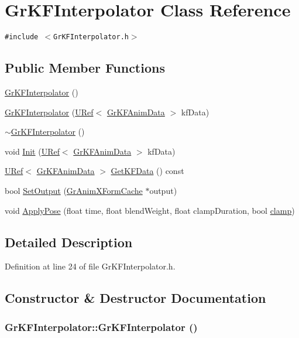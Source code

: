 \hypertarget{class_gr_k_f_interpolator}{
\section{GrKFInterpolator Class Reference}
\label{class_gr_k_f_interpolator}
}
{\tt \#include $<$GrKFInterpolator.h$>$}

\subsection*{Public Member Functions}
\begin{CompactItemize}
\item 
\hyperlink{class_gr_k_f_interpolator_15e5078190fda14e51cd4e53d3395cd0}{GrKFInterpolator} ()
\item 
\hyperlink{class_gr_k_f_interpolator_1724d4329b259e148c29d9169f612997}{GrKFInterpolator} (\hyperlink{class_u_ref}{URef}$<$ \hyperlink{class_gr_k_f_anim_data}{GrKFAnimData} $>$ kfData)
\item 
\hyperlink{class_gr_k_f_interpolator_c2cc750b63e0b4472fee654ec4bdea03}{$\sim$GrKFInterpolator} ()
\item 
void \hyperlink{class_gr_k_f_interpolator_6eb1b4094005a7234edd5ca8362f5a6a}{Init} (\hyperlink{class_u_ref}{URef}$<$ \hyperlink{class_gr_k_f_anim_data}{GrKFAnimData} $>$ kfData)
\item 
\hyperlink{class_u_ref}{URef}$<$ \hyperlink{class_gr_k_f_anim_data}{GrKFAnimData} $>$ \hyperlink{class_gr_k_f_interpolator_204daa62f5b8f1dbc7bd2bc0429b0c02}{GetKFData} () const 
\item 
bool \hyperlink{class_gr_k_f_interpolator_e68da306a8aeeb0b485770cd7e813390}{SetOutput} (\hyperlink{class_gr_anim_x_form_cache}{GrAnimXFormCache} $\ast$output)
\item 
void \hyperlink{class_gr_k_f_interpolator_9733ebb52f02dff2b41993a80f199b3e}{ApplyPose} (float time, float blendWeight, float clampDuration, bool \hyperlink{glext_8h_3878d3005eeb2d2ef414abc752ba3c9b}{clamp})
\end{CompactItemize}


\subsection{Detailed Description}


Definition at line 24 of file GrKFInterpolator.h.

\subsection{Constructor \& Destructor Documentation}
\hypertarget{class_gr_k_f_interpolator_15e5078190fda14e51cd4e53d3395cd0}{
\subsubsection[{GrKFInterpolator}]{\setlength{\rightskip}{0pt plus 5cm}GrKFInterpolator::GrKFInterpolator ()}}
\label{class_gr_k_f_interpolator_15e5078190fda14e51cd4e53d3395cd0}




